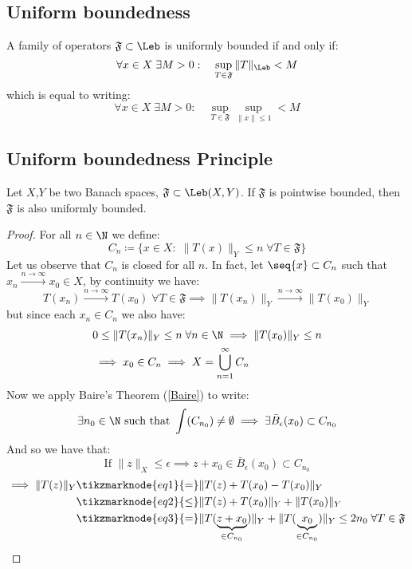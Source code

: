 \subsection{Uniform boundedness}
A family of operators $\mathfrak{F} \subset \Leb$ is uniformly bounded if and only if:
\[ \forall x \in X \; \exists M > 0: \quad \sup_{T\in\mathfrak{F}} \|T\|_{\Leb} < M \]
which is equal to writing:
\[ \forall x \in X \; \exists M > 0: \quad \sup_{T\in\mathfrak{F}} \sup_{\|x\|\leq1} < M \]

\subsection{Uniform boundedness Principle}
Let $X$,$Y$ be two Banach spaces, $\mathfrak{F}\subset\Leb(X,Y)$. If $\mathfrak{F}$ is pointwise bounded, then $\mathfrak{F}$ is also uniformly bounded.

\begin{proof}
    For all $n\in\N$ we define:
    \[ C_n \coloneqq \{ x\in X: \; \|T(x)\|_Y\leq n \; \forall T \in \mathfrak{F} \} \]
    Let us observe that $C_n$ is closed for all $n$. In fact, let $\seq{x}\subset C_n$ such that $x_n \xrightarrow{n\to\infty} x_0 \in X$, by continuity we have:
    \[ T(x_n) \xrightarrow{n\to\infty} T(x_0) \; \forall T \in \mathfrak{F} \implies \|T(x_n)\|_Y \xrightarrow{n\to\infty} \|T(x_0)\|_Y \]
    but since each $x_n \in C_n$ we also have:
    \begin{align*}
        & 0 \leq \|T(x_n)\|_Y \leq n \; \forall n \in \N \implies \|T(x_0)\|_Y \leq n \\
        & \implies x_0 \in C_n \implies X = \bigcup_{n=1}^\infty C_n
    \end{align*}
    Now we apply Baire's Theorem (\ref{Baire}) to write:
    \[ \exists n_0 \in \N \text{ such that } \int(C_{n_0}) \neq \emptyset \implies \exists \bar{B}_\epsilon(x_0) \subset C_{n_0} \]
    And so we have that:
    \[ \text{If } \|z\|_X \leq \epsilon \implies z+x_0 \in \bar{B}_\epsilon(x_0) \subset C_{n_0} \]
    \begin{align*}
        \implies \|T(z)\|_Y & \tikzmarknode{eq1}{=} \|T(z)+T(x_0)-T(x_0)\|_Y \\
        & \tikzmarknode{eq2}{\leq} \|T(z)+T(x_0)\|_Y + \|T(x_0)\|_Y \\
        & \tikzmarknode{eq3}{=} \|T(\underbrace{z+x_0}_{\in C_{n_0}})\|_Y + \|T(\underbrace{x_0}_{\in C_{n_0}})\|_Y \leq 2 n_0 \; \forall T \in \mathfrak{F}
    \end{align*}
\end{proof}

